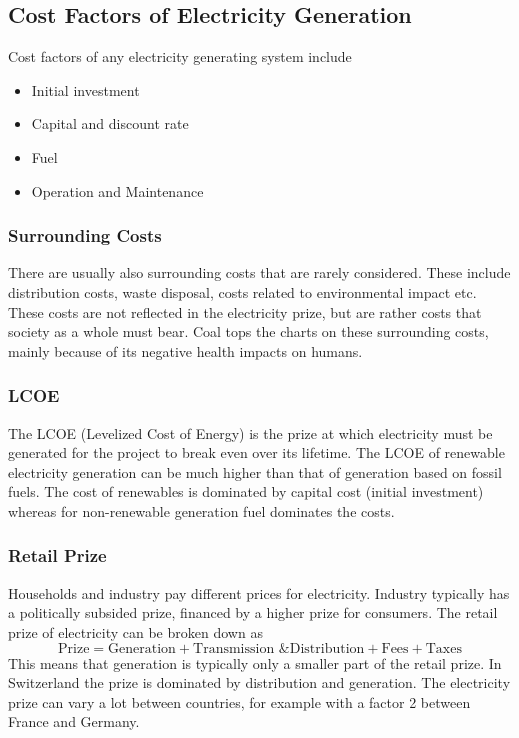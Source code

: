 \subsection{Cost Factors of Electricity Generation}

Cost factors of any electricity generating system include

\begin{itemize}
    \item Initial investment
    \item Capital and discount rate
    \item Fuel
    \item Operation and Maintenance
\end{itemize}

\subsubsection{Surrounding Costs}
There are usually also surrounding costs that are rarely considered. These include distribution costs, waste disposal, costs related to environmental impact etc.
These costs are not reflected in the electricity prize, but are rather costs that society as a whole must bear.
Coal tops the charts on these surrounding costs, mainly because of its negative health impacts on humans.\\

\subsubsection{LCOE}
The LCOE (Levelized Cost of Energy) is the prize at which electricity must be generated for the project to break even over its lifetime.
The LCOE of renewable electricity generation can be much higher than that of generation based on fossil fuels.
The cost of renewables is dominated by capital cost (initial investment) whereas for non-renewable generation fuel dominates the costs.

\subsubsection{Retail Prize}
Households and industry pay different prices for electricity.
Industry typically has a politically subsided prize, financed by a higher prize for consumers.
The retail prize of electricity can be broken down as
$$
\text{Prize} = \text{Generation} + \text{Transmission \& Distribution} + \text{Fees} + \text{Taxes}
$$
This means that generation is typically only a smaller part of the retail prize.
In Switzerland the prize is dominated by distribution and generation. The electricity prize can vary a lot between countries, for example with a factor 2 between France and Germany.

